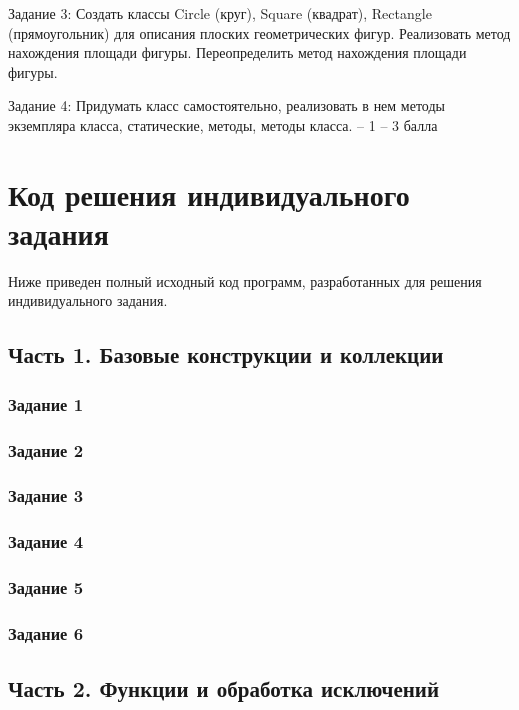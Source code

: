 \documentclass[14pt,a4paper]{extarticle}
\begin{document}
Задание 3: Создать классы Circle (круг), Square (квадрат), Rectangle (прямоугольник) для описания плоских геометрических фигур. Реализовать метод нахождения площади фигуры. Переопределить метод нахождения площади фигуры.

Задание 4:\newline
Придумать класс самостоятельно, реализовать в нем методы экземпляра класса, статические, методы, методы класса. – 1 – 3 балла

\section{Код решения индивидуального задания}
Ниже приведен полный исходный код программ, разработанных для решения индивидуального задания.

\subsection{Часть 1. Базовые конструкции и коллекции}
\subsubsection{Задание 1}

\subsubsection{Задание 2}

\subsubsection{Задание 3}

\subsubsection{Задание 4}

\subsubsection{Задание 5}

\subsubsection{Задание 6}


\subsection{Часть 2. Функции и обработка исключений}
\end{document}
